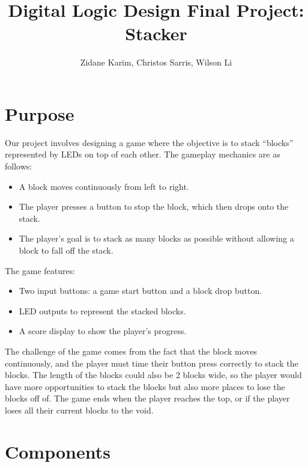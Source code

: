 \documentclass{article}
\title{Digital Logic Design Final Project: Stacker}
\author{Zidane Karim, Christos Sarris, Wilson Li}
\affil{The Skibidi Toilets}
\begin{document}
 
    \maketitle 

    \section{Purpose}
    
    Our project involves designing a game where the objective is to stack ``blocks'' represented by LEDs on top of each other. The gameplay mechanics are as follows:

    \begin{itemize}
        \item A block moves continuously from left to right.
        \item The player presses a button to stop the block, which then drops onto the stack.
        \item The player's goal is to stack as many blocks as possible without allowing a block to fall off the stack.
    \end{itemize}

    The game features:
    \begin{itemize}
        \item Two input buttons: a game start button and a block drop button.
        \item LED outputs to represent the stacked blocks.
        \item A score display to show the player's progress.
    \end{itemize}
    
    The challenge of the game comes from the fact that the block moves continuously, and the player must time their button press correctly to stack the blocks. 
    The length of the blocks could also be 2 blocks wide, so the player would have more opportunities to stack the blocks but also more places to lose the blocks off of. 
    The game ends when the player reaches the top, or if the player loses all their current blocks to the void.  

    \section{Components}
\end{document}
